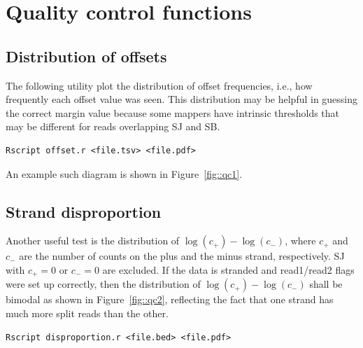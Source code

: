 \documentclass{article}
\begin{document}
\section{Quality control functions}
\subsection{Distribution of offsets}
The following utility plot the distribution of offset frequencies, i.e., how frequently each offset value was seen. This distribution may be helpful 
in guessing the correct margin value because some mappers have intrinsic thresholds that may be different for reads overlapping SJ and SB.
\begin{verbatim}
Rscript offset.r <file.tsv> <file.pdf>
\end{verbatim}
An example such diagram is shown in Figure~\ref{fig::qc1}.
\begin{figure}
\end{figure}

\subsection{Strand disproportion}
Another useful test is the distribution of $\log(c_+) - \log(c_-)$, where $c_+$ and $c_-$ are the number of counts on the plus and the minus strand, 
respectively. SJ with $c_+=0$ or $c_-=0$ are excluded. If the data is stranded and read1/read2 flags were set up correctly, then the distribution of
$\log(c_+) - \log(c_-)$ shall be bimodal as shown in Figure~\ref{fig::qc2}, reflecting the fact that one strand has much more split reads than 
the other.
\begin{verbatim}
Rscript disproportion.r <file.bed> <file.pdf>
\end{verbatim}
\end{document}
